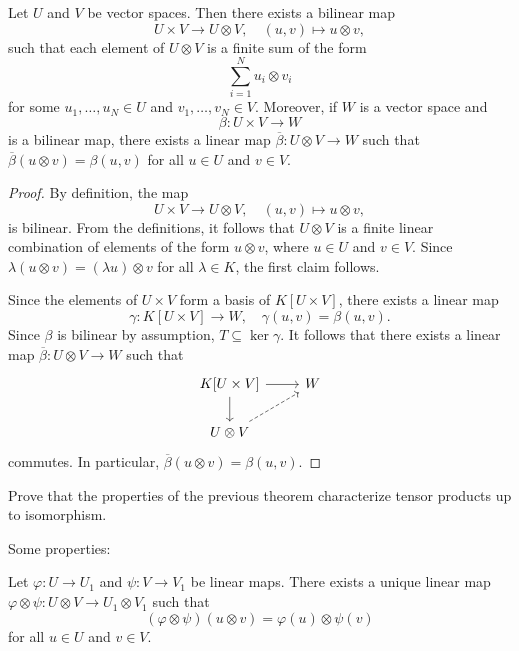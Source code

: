 \begin{theorem}
	Let $U$ and $V$ be vector spaces. Then there exists a bilinear map 
	\[
    U\times V\to U\otimes V,\quad (u,v)\mapsto u\otimes v,
    \]
    such that 
	each element of $U\otimes V$ is a finite sum of the form 
	\[
		\sum_{i=1}^N u_i\otimes v_i
	\]
	for some $u_1,\dots,u_N\in U$ and $v_1,\dots,v_N\in V$. 
	Moreover, if $W$ is a vector space and 
 \[
 \beta\colon U\times V\to W
 \]
 is a bilinear map, 
	there exists a linear map 
	$\overline{\beta}\colon U\otimes V\to W$ such that $\overline{\beta}(u\otimes
	v)=\beta(u,v)$ for all $u\in U$ and $v\in V$.
\end{theorem}

\begin{proof}
    By definition, the map
    \[
	U\times V\to U\otimes V,\quad
	(u,v)\mapsto u\otimes v,
	\]
	is bilinear. From the definitions, it follows that
	$U\otimes V$ is a finite linear combination of elements of the form 
	$u\otimes v$, where $u\in U$ and $v\in V$. Since $\lambda(u\otimes
	v)=(\lambda u)\otimes v$ for all $\lambda\in K$, the first claim follows.

	Since the elements of $U\times V$ form a basis of $K[U\times V]$, there exists
	a linear map 
	\[
		\gamma\colon K[U\times V]\to W,\quad
	\gamma(u,v)=\beta(u,v). 
	\]
	Since $\beta$ is bilinear by assumption, $T\subseteq\ker\gamma$. It follows that there exists 
	a linear map $\overline{\beta}\colon U\otimes V\to
	W$ such that  
	\[
	\begin{tikzcd}
		K[U\times V] \arrow[r]\arrow[d] & W \\
		U\otimes V\arrow[ur, dashrightarrow]
	\end{tikzcd}
	\]
	commutes. In particular, $\overline{\beta}(u\otimes v)=\beta(u,v)$. 
\end{proof}

\begin{exercise}
	\label{xca:tensorial_unicidad}
	Prove that the properties of the previous theorem characterize tensor products up to isomorphism. 
\end{exercise}

Some properties:

\begin{proposition}
	Let $\varphi\colon U\to U_1$ and $\psi\colon V\to V_1$ be linear maps. There
	exists a unique linear map 
	$\varphi\otimes\psi\colon U\otimes V\to U_1\otimes V_1$ such that
	\[
		(\varphi\otimes\psi)(u\otimes v)=\varphi(u)\otimes\psi(v)
	\]
	for all $u\in U$ and $v\in V$.
\end{proposition}


